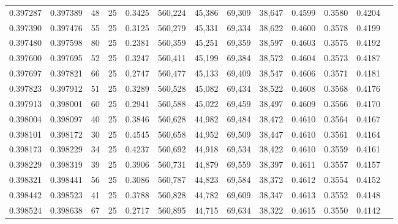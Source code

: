 \begin{tabular}{rrrrrrrrrrrrr}
0.397287 & 0.397389 &    48 &  25 &                                     0.3425 & 560,224 &  45,386 &  69,309 &  38,647 & 0.4599 & 0.3580 & 0.4204 \\
0.397390 & 0.397476 &    55 &  25 &                                     0.3125 & 560,279 &  45,331 &  69,334 &  38,622 & 0.4600 & 0.3578 & 0.4199 \\
0.397480 & 0.397598 &    80 &  25 &                                     0.2381 & 560,359 &  45,251 &  69,359 &  38,597 & 0.4603 & 0.3575 & 0.4192 \\
0.397600 & 0.397695 &    52 &  25 &                                     0.3247 & 560,411 &  45,199 &  69,384 &  38,572 & 0.4604 & 0.3573 & 0.4187 \\
0.397697 & 0.397821 &    66 &  25 &                                     0.2747 & 560,477 &  45,133 &  69,409 &  38,547 & 0.4606 & 0.3571 & 0.4181 \\
0.397823 & 0.397912 &    51 &  25 &                                     0.3289 & 560,528 &  45,082 &  69,434 &  38,522 & 0.4608 & 0.3568 & 0.4176 \\
0.397913 & 0.398001 &    60 &  25 &                                     0.2941 & 560,588 &  45,022 &  69,459 &  38,497 & 0.4609 & 0.3566 & 0.4170 \\
0.398004 & 0.398097 &    40 &  25 &                                     0.3846 & 560,628 &  44,982 &  69,484 &  38,472 & 0.4610 & 0.3564 & 0.4167 \\
0.398101 & 0.398172 &    30 &  25 &                                     0.4545 & 560,658 &  44,952 &  69,509 &  38,447 & 0.4610 & 0.3561 & 0.4164 \\
0.398173 & 0.398229 &    34 &  25 &                                     0.4237 & 560,692 &  44,918 &  69,534 &  38,422 & 0.4610 & 0.3559 & 0.4161 \\
0.398229 & 0.398319 &    39 &  25 &                                     0.3906 & 560,731 &  44,879 &  69,559 &  38,397 & 0.4611 & 0.3557 & 0.4157 \\
0.398321 & 0.398441 &    56 &  25 &                                     0.3086 & 560,787 &  44,823 &  69,584 &  38,372 & 0.4612 & 0.3554 & 0.4152 \\
0.398442 & 0.398523 &    41 &  25 &                                     0.3788 & 560,828 &  44,782 &  69,609 &  38,347 & 0.4613 & 0.3552 & 0.4148 \\
0.398524 & 0.398638 &    67 &  25 &                                     0.2717 & 560,895 &  44,715 &  69,634 &  38,322 & 0.4615 & 0.3550 & 0.4142 \\

\end{tabular}
